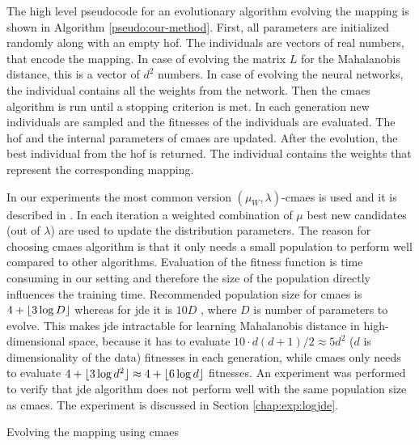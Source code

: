 \documentclass[12pt,a4paper]{report}
\begin{document}
The high level pseudocode for an evolutionary algorithm evolving the mapping is shown in Algorithm \ref{pseudo:our-method}. First, all parameters are initialized randomly along with an empty \ac{hof}. The individuals are vectors of real numbers, that encode the mapping. In case of evolving the matrix $L$ for the Mahalanobis distance, this is a vector of $d^2$ numbers. In case of evolving the neural networks, the individual contains all the weights from the network. Then the \ac{cmaes} algorithm is run until a stopping criterion is met. In each generation new individuals are sampled and the fitnesses of the individuals are evaluated. The \ac{hof} and the internal parameters of \ac{cmaes} are updated. After the evolution, the best individual from the \ac{hof} is returned. The individual contains the weights that represent the corresponding mapping.

In our experiments the most common version $(\mu_W, \lambda)$-\ac{cmaes} is used and it is described in \citep{hansen2001completely}. In each iteration a weighted combination of $\mu$ best new candidates (out of $\lambda$) are used to update the distribution parameters. The reason for choosing \ac{cmaes} algorithm is that it only needs a small population to perform well compared to other algorithms. Evaluation of the fitness function is time consuming in our setting and therefore the size of the population directly influences the training time. Recommended population size for \ac{cmaes} is $4+\lfloor3\log{D}\rfloor$ \citep{hansen2006cma} whereas for \ac{jde} it is $10D$ \citep{brest2006self}, where $D$ is number of parameters to evolve. This makes \ac{jde} intractable for learning Mahalanobis distance in high-dimensional space, because it has to evaluate $10\cdot d(d+1)/2 \approx 5d^2$ ($d$ is dimensionality of the data) fitnesses in each generation, while \ac{cmaes} only needs to evaluate $4+\lfloor3\log{d^2}\rfloor \approx 4+\lfloor6\log{d}\rfloor$ fitnesses. An experiment was performed to verify that \ac{jde} algorithm does not perform well with the same population size as \ac{cmaes}. The experiment is discussed in Section \ref{chap:exp:logjde}.

\begin{algorithm}[t]
\caption{Evolving the mapping using \ac{cmaes}} \label{pseudo:our-method}
\DontPrintSemicolon
\LinesNumbered
{}
\end{algorithm} 
\end{document}
